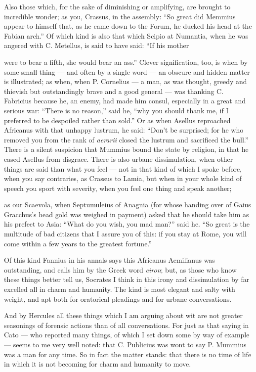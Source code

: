  Also those which, for the sake of diminishing or amplifying, are brought to incredible wonder; as you, Crassus, in the assembly: ``So great did Memmius appear to himself that, as he came down to the Forum, he ducked his head at the Fabian arch.'' Of which kind is also that which Scipio at Numantia, when he was angered with C. Metellus, is said to have said: ``If his mother

 were to bear a fifth, she would bear an ass.'' Clever signification, too, is when by some small thing — and often by a single word — an obscure and hidden matter is illustrated; as when, when P. Cornelius — a man, as was thought, greedy and thievish but outstandingly brave and a good general — was thanking C. Fabricius because he, an enemy, had made him consul, especially in a great and serious war: ``There is no reason,'' said he, ``why you should thank me, if I preferred to be despoiled rather than sold.'' Or as when Asellus reproached Africanus with that unhappy lustrum, he said: ``Don't be surprised; for he who removed you from the rank of \textit{aerarii} closed the lustrum and sacrificed the bull.'' There is a silent suspicion that Mummius bound the state by religion, in that he eased Asellus from disgrace. There is also urbane dissimulation, when other things are said than what you feel — not in that kind of which I spoke before, when you say contraries, as Crassus to Lamia, but when in your whole kind of speech you sport with severity, when you feel one thing and speak another;

 as our Scaevola, when Septumuleius of Anagnia (for whose handing over of Gaius Gracchus's head gold was weighed in payment) asked that he should take him as his prefect to Asia: ``What do you wish, you mad man?'' said he. ``So great is the multitude of bad citizens that I assure you of this: if you stay at Rome, you will come within a few years to the greatest fortune.''

 Of this kind Fannius in his annals says this Africanus Aemilianus was outstanding, and calls him by the Greek word \textit{eiron}; but, as those who know these things better tell us, Socrates I think in this irony and dissimulation by far excelled all in charm and humanity. The kind is most elegant and salty with weight, and apt both for oratorical pleadings and for urbane conversations.

 And by Hercules all these things which I am arguing about wit are not greater seasonings of forensic actions than of all conversations. For just as that saying in Cato — who reported many things, of which I set down some by way of example — seems to me very well noted: that C. Publicius was wont to say P. Mummius was a man for any time. So in fact the matter stands: that there is no time of life in which it is not becoming for charm and humanity to move.

